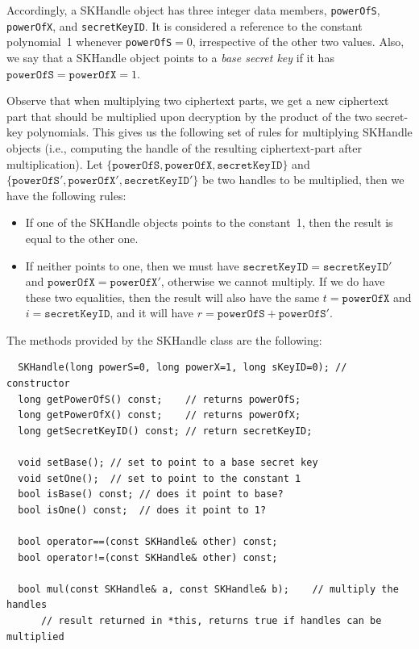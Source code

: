 \documentclass[14pt]{extarticle}
\def\SKHandle{\textsf{SKHandle}}
\begin{document}
Accordingly, a {\SKHandle} object has three integer data members,
\texttt{powerOfS}, \texttt{powerOfX}, and \texttt{secretKeyID}.
It is considered a reference to the constant polynomial~1 whenever
\texttt{powerOfS}$=0$, irrespective of the other two values. Also, we
say that a {\SKHandle} object points to a \emph{base secret key} if
it has $\mathtt{powerOfS}=\mathtt{powerOfX}=1$. 

Observe that when multiplying two ciphertext parts, we get a new
ciphertext part that should be multiplied upon decryption by the
product of the two secret-key polynomials. This gives us the following
set of rules for multiplying {\SKHandle} objects (i.e., computing the
handle of the resulting ciphertext-part after multiplication). Let
$\{\mathtt{powerOfS},\mathtt{powerOfX},\mathtt{secretKeyID}\}$ and
$\{\mathtt{powerOfS}',\mathtt{powerOfX}',\mathtt{secretKeyID}'\}$ be
two handles to be multiplied, then we have the following rules:
\begin{itemize}
\item If one of the {\SKHandle} objects points to the constant~1, then
the result is equal to the other one.

\item If neither points to one, then we must have
$\mathtt{secretKeyID}=\mathtt{secretKeyID}'$ and $\mathtt{powerOfX}=
\mathtt{powerOfX}'$, otherwise we cannot multiply. If we do have
these two equalities, then the result will also have the same
$t=\mathtt{powerOfX}$ and $i=\mathtt{secretKeyID}$, and it will
have $r=\mathtt{powerOfS}+\mathtt{powerOfS}'$.
\end{itemize} 
The methods provided by the {\SKHandle} class are the following:
\begin{verbatim}
  SKHandle(long powerS=0, long powerX=1, long sKeyID=0); // constructor
  long getPowerOfS() const;    // returns powerOfS;
  long getPowerOfX() const;    // returns powerOfX;
  long getSecretKeyID() const; // return secretKeyID;

  void setBase(); // set to point to a base secret key
  void setOne();  // set to point to the constant 1
  bool isBase() const; // does it point to base?
  bool isOne() const;  // does it point to 1?

  bool operator==(const SKHandle& other) const;
  bool operator!=(const SKHandle& other) const;

  bool mul(const SKHandle& a, const SKHandle& b);    // multiply the handles
      // result returned in *this, returns true if handles can be multiplied
\end{verbatim}
\end{document}
